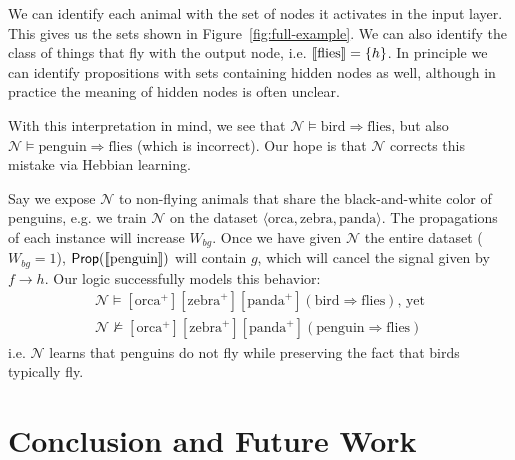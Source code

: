 \documentclass[letterpaper]{article}
\theoremstyle{definition}
\newcommand{\semantics}[1]{[\![\mbox{\em $ #1 $\/}]\!]}
\newcommand{\set}[1]{\{ #1 \}}
\newcommand{\Typ}{\textrm{\textup{\textbf{T}}}}
\newcommand{\Prop}{\textsf{Prop}}
\newcommand{\Net}{\mathcal{N}}
\begin{document}
We can identify each animal with the set of nodes it activates in the input layer.  This gives us the sets shown in Figure~\ref{fig:full-example}.  We can also identify the class of things that fly with the output node, i.e. $\semantics{\textup{flies}} = \set{h}$.  In principle we can identify propositions with sets containing hidden nodes as well, although in practice the meaning of hidden nodes is often unclear.

With this interpretation in mind, we see that $\Net \models \textrm{bird} \Rightarrow \textrm{flies}$, but also $\Net \models \textrm{penguin} \Rightarrow \textrm{flies}$ (which is incorrect).  Our hope is that $\Net$ corrects this mistake via Hebbian learning.

Say we expose $\Net$ to non-flying animals that share the black-and-white color of penguins, e.g. we train $\Net$ on the dataset $\langle \textrm{orca}, \textrm{zebra}, \textrm{panda} \rangle$.  The propagations of each instance will increase $W_{bg}$.  Once we have given $\Net$ the entire dataset ($W_{bg} = 1$), $\Prop(\semantics{\textup{penguin}})$ will contain $g$, which will cancel the signal given by ${f \to h}$.  Our logic successfully models this behavior:
\[
\begin{array}{l}
\Net \models [\textrm{orca}^+] [\textrm{zebra}^+] [\textrm{panda}^+] (\textrm{bird} \Rightarrow \textrm{flies}) \textrm{, yet}\\
\Net \not \models [\textrm{orca}^+] [\textrm{zebra}^+] [\textrm{panda}^+] (\textrm{penguin} \Rightarrow \textrm{flies})
\end{array}
\]
i.e. $\Net$ learns that penguins do not fly while preserving the fact that birds typically fly. 


\section{Conclusion and Future Work}
\end{document}
